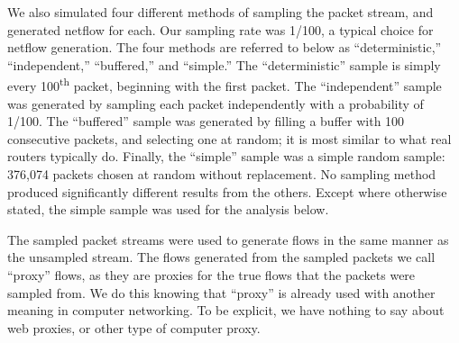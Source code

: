 \documentclass{paper}
\newcommand{\ts}{\textsuperscript}
\begin{document}
We also simulated four different methods of sampling the packet stream, and
generated netflow for each. Our sampling rate was 1/100, a typical choice for
netflow generation. The four methods are referred to below as ``deterministic,''
``independent,'' ``buffered,'' and ``simple.'' The ``deterministic'' sample is
simply every 100\ts{th} packet, beginning with the first packet. The
``independent'' sample was generated by sampling each packet independently with
a probability of 1/100. The ``buffered'' sample was generated by filling a
buffer with 100 consecutive packets, and selecting one at random; it is most
similar to what real routers typically do. Finally, the ``simple'' sample was a
simple random sample: 376,074 packets chosen at random without replacement. No
sampling method produced significantly different results from the others.
Except where otherwise stated, the simple sample was used for the analysis
below.

The sampled packet streams were used to generate flows in the same manner as the
unsampled stream. The flows generated from the sampled packets we call ``proxy''
flows, as they are proxies for the true flows that the packets were sampled
from. We do this knowing that ``proxy'' is already used with another meaning in
computer networking. To be explicit, we have nothing to say about web proxies,
or other type of computer proxy.
\end{document}
